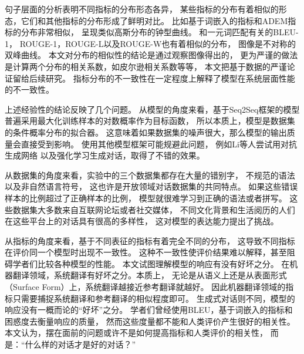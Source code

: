 句子层面的分析表明不同指标的分布形态各异， 某些指标的分布有着相似的形态，它们和其他指标的分布形成了鲜明对比。 比如基于词嵌入的指标和ADEM指标的分布非常相似， 呈现类似高斯分布的钟型曲线。 和一元词匹配有关的BLEU-1， ROUGE-1，ROUGE-L以及ROUGE-W也有着相似的分布， 图像是不对称的双峰曲线。 本文对分布的相似性的结论是通过观察图像得出的， 更为严谨的做法是计算两个分布的相关系数，如皮尔逊相关系数等等， 本文把基于数据的严谨论证留给后续研究。 指标分布的不一致性在一定程度上解释了模型在系统层面性能的不一致性。

上述经验性的结论反映了几个问题。 从模型的角度来看，基于Seq2Seq框架的模型普遍采用最大化训练样本的对数概率作为目标函数， 所以本质上，模型是数据集的条件概率分布的拟合器。 这意味着如果数据集的噪声很大，那么模型的输出质量会直接受到影响。 使用其他模型框架可能规避此问题， 例如Li等人尝试用对抗生成网络 以及强化学习生成对话，取得了不错的效果。

从数据集的角度来看，实验中的三个数据集都存在大量的错别字， 不规范的语法以及非自然语言符号， 这也许是开放领域对话数据集的共同特点。 如果这些错误样本的比例超过了正确样本的比例， 模型就很难学习到正确的语法或者拼写。 这些数据集大多数来自互联网论坛或者社交媒体， 不同文化背景和生活阅历的人们在这些平台上的对话具有很高的多样性， 这对模型的表达能力提出了挑战。

从指标的角度来看，基于不同表征的指标有着完全不同的分布， 这导致不同指标在评价同一个模型时出现不一致性。 这种不一致性使评价结果难以解释，甚至阻碍学者们比较各种模型的性能。 本文试图理解模型的响应有没有好坏之分。 在机器翻译领域，系统翻译有好坏之分。本质上， 无论是从语义上还是从表面形式（Surface Form）上，系统翻译越接近参考翻译就越好。 因此机器翻译领域的指标只需要捕捉系统翻译和参考翻译的相似程度即可。 生成式对话则不同，模型的响应没有一概而论的“好坏”之分。 学者们曾经使用BLEU，基于词嵌入的指标和 困惑度去衡量响应的质量， 然而这些度量都不能和人类评价产生很好的相关性。 本文认为，摆在面前的问题或许不是如何提高指标和人类评价的相关性， 而是：“什么样的对话才是好的对话？”
